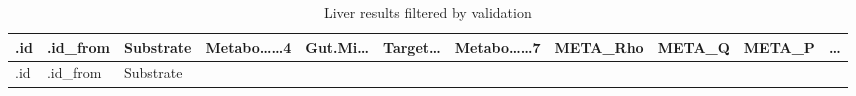 \documentclass[
]{article}
\begin{document}
\begin{longtable}[]{@{}lllllllllll@{}}
\caption{\label{tab:Liver-results-filtered-by-validation}Liver results filtered by validation}\tabularnewline
\toprule
\begin{minipage}[b]{0.05\columnwidth}\raggedright
.id\strut
\end{minipage} & \begin{minipage}[b]{0.07\columnwidth}\raggedright
.id\_from\strut
\end{minipage} & \begin{minipage}[b]{0.07\columnwidth}\raggedright
Substrate\strut
\end{minipage} & \begin{minipage}[b]{0.09\columnwidth}\raggedright
Metabo\ldots\ldots4\strut
\end{minipage} & \begin{minipage}[b]{0.07\columnwidth}\raggedright
Gut.Mi\ldots{}\strut
\end{minipage} & \begin{minipage}[b]{0.07\columnwidth}\raggedright
Target\ldots{}\strut
\end{minipage} & \begin{minipage}[b]{0.09\columnwidth}\raggedright
Metabo\ldots\ldots7\strut
\end{minipage} & \begin{minipage}[b]{0.07\columnwidth}\raggedright
META\_Rho\strut
\end{minipage} & \begin{minipage}[b]{0.07\columnwidth}\raggedright
META\_Q\strut
\end{minipage} & \begin{minipage}[b]{0.07\columnwidth}\raggedright
META\_P\strut
\end{minipage} & \begin{minipage}[b]{0.03\columnwidth}\raggedright
\ldots{}\strut
\end{minipage}\tabularnewline
\midrule
\endfirsthead
\toprule
\begin{minipage}[b]{0.05\columnwidth}\raggedright
.id\strut
\end{minipage} & \begin{minipage}[b]{0.07\columnwidth}\raggedright
.id\_from\strut
\end{minipage} & \begin{minipage}[b]{0.07\columnwidth}\raggedright
Substrate\strut
\end{minipage} & \begin{minipage}[b]{0.09\columnwidth}\raggedright

\end{minipage}
\end{longtable}
\end{document}
